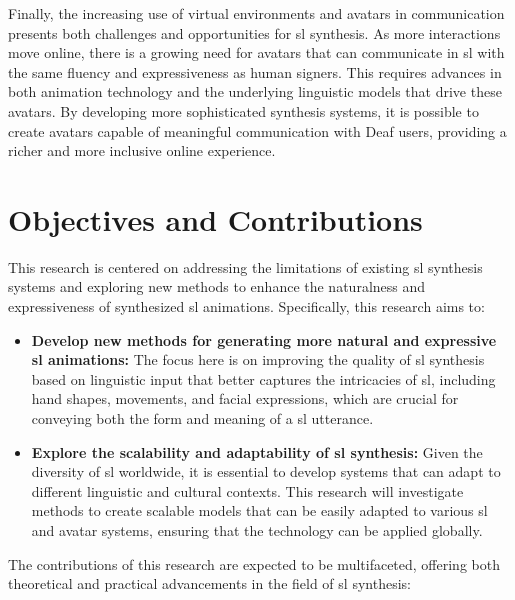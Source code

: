 \documentclass[../../main.tex]{subfiles}
\begin{document}
Finally, the increasing use of virtual environments and avatars in communication presents both challenges and opportunities for \gls{sl} synthesis. As more interactions move online, there is a growing need for avatars that can communicate in \gls{sl} with the same fluency and expressiveness as human signers. This requires advances in both animation technology and the underlying linguistic models that drive these avatars. By developing more sophisticated synthesis systems, it is possible to create avatars capable of meaningful communication with Deaf users, providing a richer and more inclusive online experience.

\section{Objectives and Contributions}
\label{ch:introduction:objectives_contributions}

This research is centered on addressing the limitations of existing \gls{sl} synthesis systems and exploring new methods to enhance the naturalness and expressiveness of synthesized \gls{sl} animations. Specifically, this research aims to:

\begin{itemize}
    \item \textbf{Develop new methods for generating more natural and expressive \gls{sl} animations:} The focus here is on improving the quality of \gls{sl} synthesis based on linguistic input that better captures the intricacies of \gls{sl}, including hand shapes, movements, and facial expressions, which are crucial for conveying both the form and meaning of a \gls{sl} utterance.
    \item \textbf{Explore the scalability and adaptability of \gls{sl} synthesis:} Given the diversity of \gls{sl} worldwide, it is essential to develop systems that can adapt to different linguistic and cultural contexts. This research will investigate methods to create scalable models that can be easily adapted to various \gls{sl} and avatar systems, ensuring that the technology can be applied globally.
\end{itemize}

The contributions of this research are expected to be multifaceted, offering both theoretical and practical advancements in the field of \gls{sl} synthesis:
\end{document}
